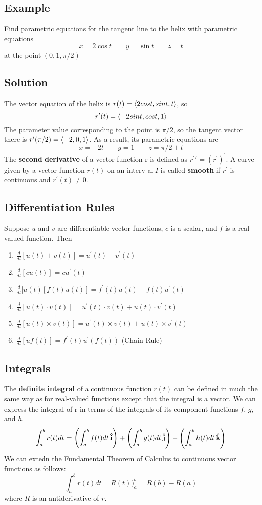 \subsection*{Example}
Find parametric equations for the tangent line to the helix with parametric equations $$x = 2\cos{t}\qquad y = \sin{t}\qquad z = t$$ at the point $(0, 1, \pi/2)$
\subsection*{Solution}
The vector equation of the helix is $r(t) = \ev{2cos{t}, sin{t}, t}$, so $$r^\prime(t) = \ev{-2sin{t}, cos{t}, 1}$$ 
The parameter value corresponding to the point is $\pi/2$, so the tangent vector there is $r^\prime(\pi/2) = \ev{-2, 0, 1}$. As a result, its parametric equations are 
$$x = -2t\qquad y= 1\qquad z = \pi/2 + t$$The \textbf{second derivative} of a vector function r is defined as $r^\prime\prime = (r^\prime)^\prime$. 
A curve given by a vector function $r(t)$ on an interv al $I$ is called \textbf{smooth} if $r^\prime$ is continuous and $r^\prime(t)\neq 0$.
\subsection*{Differentiation Rules}
Suppose $u$ and $v$ are differentiable vector functions, $c$ is a scalar, and $f$ is a real-valued function. Then
\begin{enumerate}
    \item $\frac{d}{dt}[u(t) + v(t)] = u^\prime(t) + v^\prime(t)$
    \item $\frac{d}{dt}[cu(t)] = cu^\prime(t)$
    \item $\frac{d}{dt}[u(t)[f(t)u(t)] = f^\prime(t)u(t) + f(t)u^\prime(t)$
    \item $\frac{d}{dt}[u(t)\cdot v(t)] = u^\prime(t)\cdot v(t) + u(t)\cdot v^\prime(t)$
    \item $\frac{d}{dt}[u(t)\times v(t)] = u^\prime(t)\times v(t) + u(t)\times v^\prime(t)$
    \item $\frac{d}{dt}[uf(t)] = f^\prime(t)u^\prime(f(t))$ (Chain Rule)
\end{enumerate}

\subsection*{Integrals}
The \textbf{definite integral} of a continuous function $r(t)$ can be defined in much the same way as for real-valued functions except that the integral is a vector. We can express the integral of r in terms of the integrals of its component functions $f$, $g$, and $h$.
$$\int^b_ar(t)dt = \left(\int^b_af(t)dt\:\boldsymbol{\hat{\textbf{i}}}\right) + \left(\int^b_ag(t)dt\:\boldsymbol{\hat{\textbf{j}}}\right) + \left(\int^b_ah(t)dt\:\boldsymbol{\hat{\textbf{k}}}\right)$$
We can extedn the Fundamental Theorem of Calculus to continuous vector functions as follows: $$\int^b_ar(t)dt = R(t)\Big)^b_a = R(b) - R(a)$$
where $R$ is an antiderivative of $r$. 

